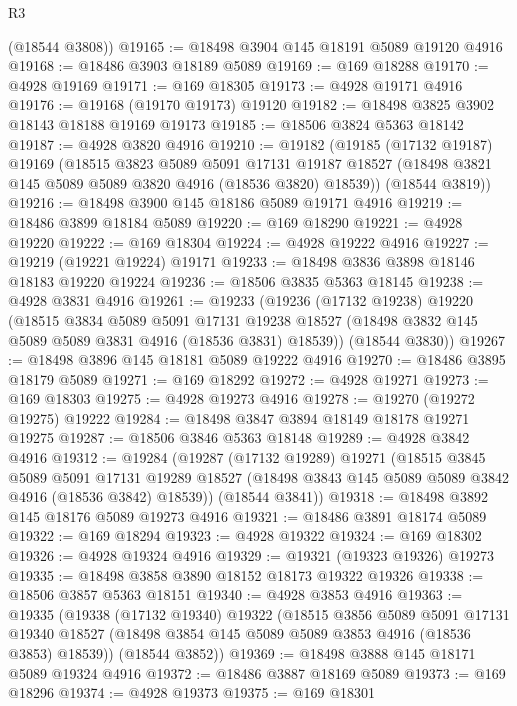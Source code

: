 \begin{lexlean}{R3}
\begin{coremodule}
      (@18544 @3808))
@19165 := @18498 @3904 @145 @18191 @5089 @19120 @4916
@19168 := @18486 @3903 @18189 @5089
@19169 := @169 @18288
@19170 := @4928 @19169
@19171 := @169 @18305
@19173 := @4928 @19171 @4916
@19176 := @19168 (@19170 @19173) @19120
@19182 := @18498 @3825 @3902 @18143 @18188 @19169 @19173
@19185 := @18506 @3824 @5363 @18142
@19187 := @4928 @3820 @4916
@19210 := @19182
    (@19185
      (@17132 @19187)
      @19169
      (@18515
        @3823
        @5089
        @5091
        @17131
        @19187
        @18527
        (@18498 @3821 @145 @5089 @5089 @3820 @4916 (@18536 @3820) @18539))
      (@18544 @3819))
@19216 := @18498 @3900 @145 @18186 @5089 @19171 @4916
@19219 := @18486 @3899 @18184 @5089
@19220 := @169 @18290
@19221 := @4928 @19220
@19222 := @169 @18304
@19224 := @4928 @19222 @4916
@19227 := @19219 (@19221 @19224) @19171
@19233 := @18498 @3836 @3898 @18146 @18183 @19220 @19224
@19236 := @18506 @3835 @5363 @18145
@19238 := @4928 @3831 @4916
@19261 := @19233
    (@19236
      (@17132 @19238)
      @19220
      (@18515
        @3834
        @5089
        @5091
        @17131
        @19238
        @18527
        (@18498 @3832 @145 @5089 @5089 @3831 @4916 (@18536 @3831) @18539))
      (@18544 @3830))
@19267 := @18498 @3896 @145 @18181 @5089 @19222 @4916
@19270 := @18486 @3895 @18179 @5089
@19271 := @169 @18292
@19272 := @4928 @19271
@19273 := @169 @18303
@19275 := @4928 @19273 @4916
@19278 := @19270 (@19272 @19275) @19222
@19284 := @18498 @3847 @3894 @18149 @18178 @19271 @19275
@19287 := @18506 @3846 @5363 @18148
@19289 := @4928 @3842 @4916
@19312 := @19284
    (@19287
      (@17132 @19289)
      @19271
      (@18515
        @3845
        @5089
        @5091
        @17131
        @19289
        @18527
        (@18498 @3843 @145 @5089 @5089 @3842 @4916 (@18536 @3842) @18539))
      (@18544 @3841))
@19318 := @18498 @3892 @145 @18176 @5089 @19273 @4916
@19321 := @18486 @3891 @18174 @5089
@19322 := @169 @18294
@19323 := @4928 @19322
@19324 := @169 @18302
@19326 := @4928 @19324 @4916
@19329 := @19321 (@19323 @19326) @19273
@19335 := @18498 @3858 @3890 @18152 @18173 @19322 @19326
@19338 := @18506 @3857 @5363 @18151
@19340 := @4928 @3853 @4916
@19363 := @19335
    (@19338
      (@17132 @19340)
      @19322
      (@18515
        @3856
        @5089
        @5091
        @17131
        @19340
        @18527
        (@18498 @3854 @145 @5089 @5089 @3853 @4916 (@18536 @3853) @18539))
      (@18544 @3852))
@19369 := @18498 @3888 @145 @18171 @5089 @19324 @4916
@19372 := @18486 @3887 @18169 @5089
@19373 := @169 @18296
@19374 := @4928 @19373
@19375 := @169 @18301

\end{coremodule}
\end{lexlean}
